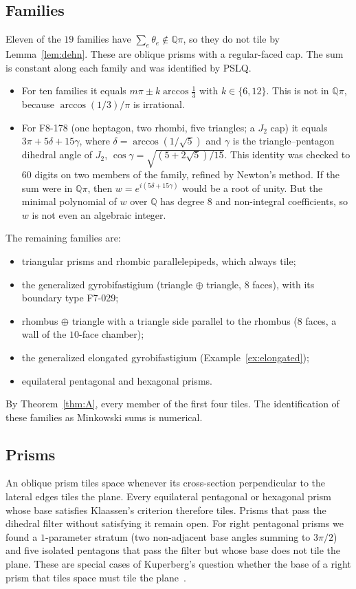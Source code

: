 \documentclass[11pt]{amsart}
\theoremstyle{definition}
\newcommand{\Q}{\mathbb{Q}}
\newcommand{\msum}{\oplus}
\begin{document}
\subsection{Families}
Eleven of the $19$ families have $\sum_e\theta_e\notin\Q\pi$, so they do not tile by Lemma~\ref{lem:dehn}. These are
oblique prisms with a regular-faced cap. The sum is constant along each family and was identified by PSLQ.
\begin{itemize}[leftmargin=2em]
\item For ten families it equals $m\pi\pm k\arccos\frac13$ with $k\in\{6,12\}$. This is not in $\Q\pi$, because
$\arccos(1/3)/\pi$ is irrational.
\item For F8-178 (one heptagon, two rhombi, five triangles; a $J_2$ cap) it equals $3\pi+5\delta+15\gamma$, where
$\delta=\arccos(1/\sqrt5)$ and $\gamma$ is the triangle--pentagon dihedral angle of $J_2$,
$\cos\gamma=\sqrt{(5+2\sqrt5)/15}$. This identity was checked to $60$ digits on two members of the family, refined by
Newton's method. If the sum were in $\Q\pi$, then $w=e^{i(5\delta+15\gamma)}$ would be a root of unity. But the minimal
polynomial of $w$ over $\Q$ has degree $8$ and non-integral coefficients, so $w$ is not even an algebraic integer.
\end{itemize} The remaining
families are:
\begin{itemize}[leftmargin=2em]
\item triangular prisms and rhombic parallelepipeds, which always tile;
\item the generalized gyrobifastigium (triangle $\msum$ triangle, $8$ faces), with its boundary type F7-029;
\item rhombus $\msum$ triangle with a triangle side parallel to the rhombus ($8$ faces, a wall of the $10$-face chamber);
\item the generalized elongated gyrobifastigium (Example~\ref{ex:elongated});
\item equilateral pentagonal and hexagonal prisms.
\end{itemize}
By Theorem~\ref{thm:A}, every member of the first four tiles. The identification of these families as
Minkowski sums is numerical.

\subsection{Prisms}
An oblique prism tiles space whenever its cross-section perpendicular to the lateral edges tiles the plane. Every
equilateral pentagonal or hexagonal prism whose base satisfies Klaassen's criterion therefore tiles. Prisms that pass
the dihedral filter without satisfying it remain open. For right pentagonal prisms we found a $1$-parameter stratum
(two non-adjacent base angles summing to $3\pi/2$) and five isolated pentagons that pass the filter but whose base does
not tile the plane. These are special cases of Kuperberg's question whether the base of a right prism that tiles space must
tile the plane~\cite{Epp}.
\end{document}
